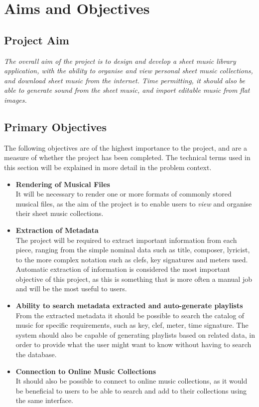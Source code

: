 \section{Aims and Objectives}
\subsection{Project Aim}
\begin{center}
\textit{The overall aim of the project is to design and develop a sheet music library application, with the ability to organise and view personal sheet music collections, and download sheet music from the internet. Time permitting, it should also be able to generate sound from the sheet music, and import editable music from flat images.}
\end{center}
\subsection{Primary Objectives}
The following objectives are of the highest importance to the project, and are a measure of whether the project has been completed. The technical terms used in this section will be explained in more detail in the problem context.
\begin{itemize}
	\item \textbf{Rendering of Musical Files}\\
    It will be necessary to render one or more formats of commonly stored musical files, as the aim of the project is to enable users to \textit{view} and organise their sheet music collections. 
    \item \textbf{Extraction of Metadata}\\
    The project will be required to extract important information from each piece, ranging from the simple nominal data such as title, composer, lyricist, to the more complex notation such as clefs, key signatures and meters used. Automatic extraction of information is considered the most important objective of this project, as this is something that is more often a manual job and will be the most useful to users. 
    \item \textbf{Ability to search metadata extracted and auto-generate playlists}\\ From the extracted metadata it should be possible to search the catalog of music for specific requirements, such as key, clef, meter, time signature. The system should also be capable of generating playlists based on related data, in order to provide what the user might want to know without having to search the database.
    \item \textbf{Connection to Online Music Collections}\\
    It should also be possible to connect to online music collections, as it would be beneficial to users to be able to search and add to their collections using the same interface.

\end{itemize}
